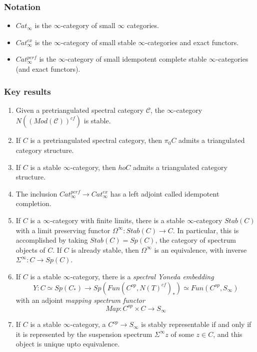 \documentclass[letterpaper]{article}
\theoremstyle{definition}
\newcommand{\mc}{\mathcal}
\begin{document}
\subsubsection{Notation}

\begin{itemize}
\item $Cat_\infty$ is the $\infty$-category of small $\infty$ categories.
\item $Cat^{ex}_\infty$ is the $\infty$-category of small stable $\infty$-categories and exact functors.
\item $Cat^{perf}_\infty$ is the $\infty$-category of small idempotent complete stable $\infty$-categories (and exact functors).
\end{itemize}

\subsubsection{Key results}

\begin{enumerate}
\item Given a pretriangulated spectral category $\mc C$, the
  $\infty$-category $N((Mod(\mc C))^{cf})$ is stable.

\item If $C$ is a pretriangulated spectral category, then $\pi_0 C$ admits a triangulated category structure.

\item If $C$ is a stable $\infty$-category, then $ho C$ admits a triangulated category structure.

\item The inclusion $Cat^{perf}_\infty \rightarrow Cat^{ex}_\infty$ has a left adjoint called idempotent completion.

\item If $C$ is a $\infty$-category with finite limits, there is a stable $\infty$-category $Stab(C)$ with a limit preserving functor $\Omega^\infty : Stab(C) \rightarrow C$. In particular, this is accomplished by taking $Stab(C) = Sp(C)$, the category of spectrum objects of $C$. If $C$ is already stable, then $\Omega^\infty$ is an equivalence, with inverse $\Sigma^\infty : C \rightarrow Sp(C)$.

\item If $C$ is a stable $\infty$-category, there is a \textit{spectral Yoneda embedding}
$$Y : C \simeq Sp(C_*) \rightarrow Sp(Fun(C^{op}, N(T)^{cf})_*) \simeq Fun(C^{op}, S_\infty)$$
with an adjoint \textit{mapping spectrum functor}
$$Map : C^{op} \times C \rightarrow S_\infty$$

\item If $C$ is a stable $\infty$-category, a $C^{op} \rightarrow S_\infty$ is stably representable if and only if it is represented by the suspension spectrum $\Sigma^\infty z$ of some $z \in C$, and this object is unique upto equivalence.

\end{enumerate}
\end{document}
